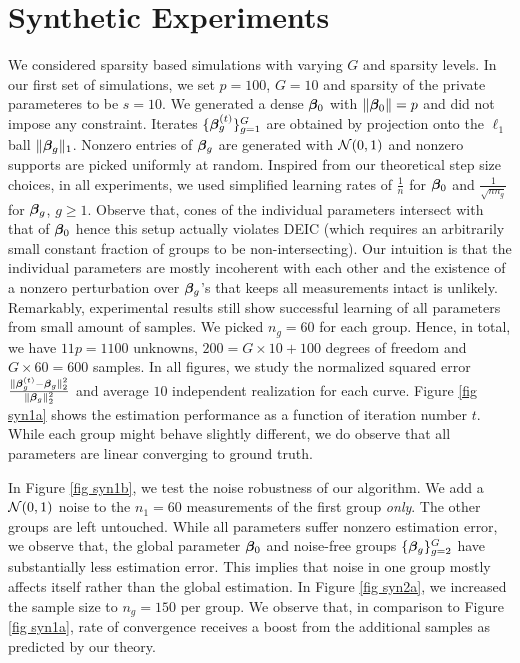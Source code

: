 \section{Synthetic Experiments}
\label{sec:expds}
We considered sparsity based simulations with varying $G$ and sparsity levels. In our first set of simulations, we set $p=100$, $G=10$ and sparsity of the private parameteres to be $s=10$. We generated a dense $\boldsymbol{\beta}_0$ with $\|\boldsymbol{\beta}_0\|=p$ and did not impose any constraint. Iterates $\{\boldsymbol{\beta}^{(t)}_g\}_{g=1}^G$ are obtained by projection onto the $\ell_1$ ball $\|\boldsymbol{\beta}_g\|_1$. Nonzero entries of $\boldsymbol{\beta}_g$ are generated with ${\cal{N}}(0,1)$ and nonzero supports are picked uniformly at random. Inspired from our theoretical step size choices, in all experiments, we used simplified learning rates of $\frac{1}{n}$ for $\boldsymbol{\beta}_0$ and $\frac{1}{\sqrt{nn_g}}$ for $\boldsymbol{\beta}_g$, $g\geq 1$. Observe that, cones of the individual parameters intersect with that of $\boldsymbol{\beta}_0$ hence this setup actually violates DEIC (which requires an arbitrarily small constant fraction of groups to be non-intersecting). Our intuition is that the individual parameters are mostly incoherent with each other and the existence of a nonzero perturbation over $\boldsymbol{\beta}_g$'s that keeps all measurements intact is unlikely. Remarkably, experimental results still show successful learning of all parameters from small amount of samples. We picked $n_g=60$ for each group. Hence, in total, we have $11p=1100$ unknowns, $200=G\times 10+100$ degrees of freedom and $G\times 60=600$ samples. In all figures, we study the normalized squared error $\frac{\|\boldsymbol{\beta}^{(t)}_g-\boldsymbol{\beta}_g\|_2^2}{\|\boldsymbol{\beta}_g\|_2^2}$ and average $10$ independent realization for each curve. Figure \ref{fig syn1a} shows the estimation performance as a function of iteration number $t$. While each group might behave slightly different, we do observe that all parameters are linear converging to ground truth.%
	
In Figure \ref{fig syn1b}, we test the noise robustness of our algorithm. We add a ${\cal{N}}(0,1)$ noise to the $n_1=60$ measurements of the first group \emph{only}. The other groups are left untouched. While all parameters suffer nonzero estimation error, we observe that, the global parameter $\boldsymbol{\beta}_0$ and noise-free groups $\{\boldsymbol{\beta}_g\}_{g=2}^G$ have substantially less estimation error. This implies that noise in one group mostly affects itself rather than the global estimation. In Figure \ref{fig syn2a}, we increased the sample size to $n_g=150$ per group. We observe that, in comparison to Figure \ref{fig syn1a}, rate of convergence receives a boost from the additional samples as predicted by our theory.
	
